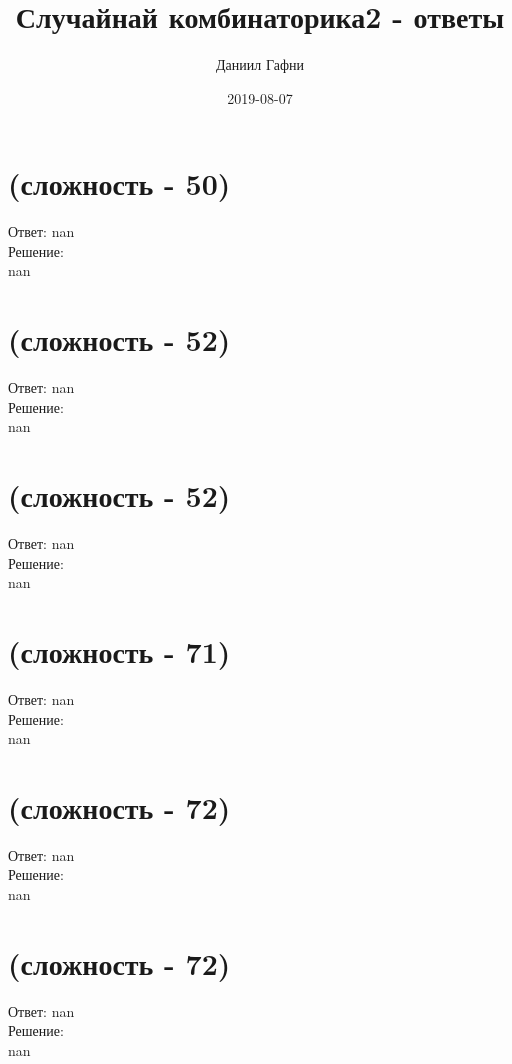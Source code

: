 \documentclass[a4paper,11pt]{article}%
\title{Случайнай комбинаторика2 {-} ответы}%
\author{Даниил Гафни}%
\date{2019{-}08{-}07}%
\begin{document}
%
\normalsize%
\maketitle%
\section{(сложность {-} 50)}%
\label{sec:( {-} 50)}%
\hspace{3ex} Ответ: nan \\%
%
\hspace*{3ex} Решение: \\%
nan

%
\section{(сложность {-} 52)}%
\label{sec:( {-} 52)}%
\hspace{3ex} Ответ: nan \\%
%
\hspace*{3ex} Решение: \\%
nan

%
\section{(сложность {-} 52)}%
\label{sec:( {-} 52)}%
\hspace{3ex} Ответ: nan \\%
%
\hspace*{3ex} Решение: \\%
nan

%
\section{(сложность {-} 71)}%
\label{sec:( {-} 71)}%
\hspace{3ex} Ответ: nan \\%
%
\hspace*{3ex} Решение: \\%
nan

%
\section{(сложность {-} 72)}%
\label{sec:( {-} 72)}%
\hspace{3ex} Ответ: nan \\%
%
\hspace*{3ex} Решение: \\%
nan

%
\section{(сложность {-} 72)}%
\label{sec:( {-} 72)}%
\hspace{3ex} Ответ: nan \\%
%
\hspace*{3ex} Решение: \\%
nan
\end{document}
